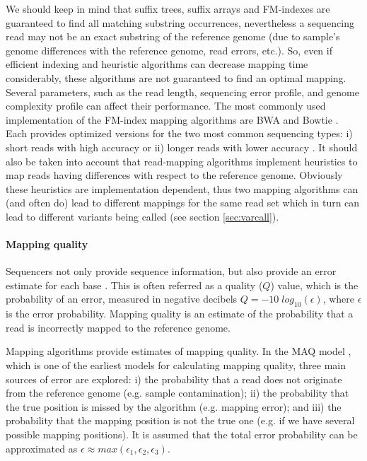 We should keep in mind that suffix trees, suffix arrays and FM-indexes are guaranteed to find all matching substring occurrences, nevertheless a sequencing read may not be an exact substring of the reference genome (due to sample's genome differences with the reference genome, read errors, etc.). 
So, even if efficient indexing and heuristic algorithms can decrease mapping time considerably, these algorithms are not guaranteed to find an optimal mapping. 
Several parameters, such as the read length, sequencing error profile, and genome complexity profile can affect their performance. 
The most commonly used implementation of the FM-index mapping algorithms are BWA \cite{li2010fast, li2010fastlong} and Bowtie \cite{langmead2009ultrafast, langmead2012fast}.  
Each provides optimized versions for the two most common sequencing types: 
i) short reads with high accuracy \cite{li2010fast,langmead2009ultrafast} or 
ii) longer reads with lower accuracy \cite{li2010fastlong, langmead2012fast}. 
It should also be taken into account that read-mapping algorithms implement heuristics to map reads having differences with respect to the reference genome. 
Obviously these heuristics are implementation dependent, thus two mapping algorithms can (and often do) lead to different mappings for the same read set which in turn can lead to different variants being called (see section \ref{sec:varcall}).

\paragraph{Mapping quality\label{sec:mapq}} 
Sequencers not only provide sequence information, but also provide an error estimate for each base \cite{li2011statistical}.
This is often referred as a quality ($Q$) value, which is the probability of an error, measured in negative decibels $Q = -10 \; log_{10}(\epsilon)$, where $\epsilon$ is the error probability. 
Mapping quality is an estimate of the probability that a read is incorrectly mapped to the reference genome. 

Mapping algorithms provide estimates of mapping quality. 
In the MAQ model \cite{li2008mapping}, which is one of the earliest models for calculating mapping quality, three main sources of error are explored: 
i) the probability that a read does not originate from the reference genome (e.g. sample contamination); 
ii) the probability that the true position is missed by the algorithm (e.g. mapping error); and 
iii) the probability that the mapping position is not the true one (e.g. if we have several possible mapping positions). 
It is assumed that the total error probability can be approximated as $\epsilon \approx max(\epsilon_1,\epsilon_2, \epsilon_3)$.


